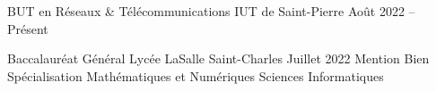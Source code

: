 

\cvevent
    {BUT en Réseaux \& Télécommunications}
    {IUT de Saint-Pierre}
    { Août 2022 -- Présent \hspace{1.25 cm}}{}

\cvevent
    {Baccalauréat Général}
    {Lycée LaSalle Saint-Charles}
    { Juillet 2022  \hspace{1.25 cm} Mention Bien}
    {}
{
    Spécialisation Mathématiques et Numériques Sciences Informatiques
}

\newcommand{\cvskillbar}[1]{
    \progressbar[
        heightr=1,
        width=3cm,
        ticksheight=0,
        filledcolor=Navy,
        linecolor=white,
        roundnessa=2pt]{#1}
}

\newcommand{\cvrow}[2]{
    \begin{row}[cellsep=0.5cm]{10}{2}%
        \begin{cell}{4}
            #1
        \end{cell}
        \begin{cell}{6}
            \cvskillbar{#2}
        \end{cell}
    \end{row}
}

\smallskip
\begin{spacing}{1.75}
\end{spacing}
    

\begin{spacing}{1.75}
\end{spacing}
